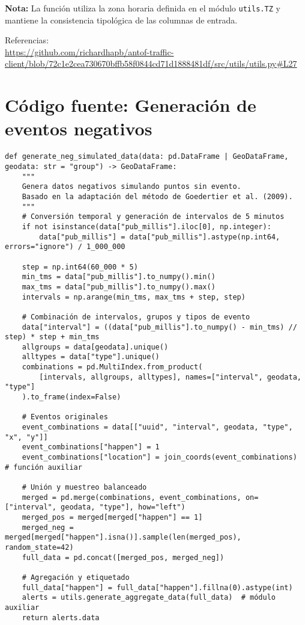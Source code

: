 \documentclass[12pt]{article}
\begin{document}
\noindent\textbf{Nota:}
La función utiliza la zona horaria definida en el módulo \texttt{utils.TZ} y mantiene la consistencia tipológica de las columnas de entrada.

Referencias: \\
\url{https://github.com/richardhapb/antof-traffic-client/blob/72c1e2cea730670bffb58f0844cd71d1888481df/src/utils/utils.py#L27}

\newpage

\section{Código fuente: Generación de eventos negativos}
\label{annex:neg_code}

\begin{verbatim}
def generate_neg_simulated_data(data: pd.DataFrame | GeoDataFrame, geodata: str = "group") -> GeoDataFrame:
    """
    Genera datos negativos simulando puntos sin evento.
    Basado en la adaptación del método de Goedertier et al. (2009).
    """
    # Conversión temporal y generación de intervalos de 5 minutos
    if not isinstance(data["pub_millis"].iloc[0], np.integer):
        data["pub_millis"] = data["pub_millis"].astype(np.int64, errors="ignore") / 1_000_000

    step = np.int64(60_000 * 5)
    min_tms = data["pub_millis"].to_numpy().min()
    max_tms = data["pub_millis"].to_numpy().max()
    intervals = np.arange(min_tms, max_tms + step, step)

    # Combinación de intervalos, grupos y tipos de evento
    data["interval"] = ((data["pub_millis"].to_numpy() - min_tms) // step) * step + min_tms
    allgroups = data[geodata].unique()
    alltypes = data["type"].unique()
    combinations = pd.MultiIndex.from_product(
        [intervals, allgroups, alltypes], names=["interval", geodata, "type"]
    ).to_frame(index=False)

    # Eventos originales
    event_combinations = data[["uuid", "interval", geodata, "type", "x", "y"]]
    event_combinations["happen"] = 1
    event_combinations["location"] = join_coords(event_combinations)  # función auxiliar

    # Unión y muestreo balanceado
    merged = pd.merge(combinations, event_combinations, on=["interval", geodata, "type"], how="left")
    merged_pos = merged[merged["happen"] == 1]
    merged_neg = merged[merged["happen"].isna()].sample(len(merged_pos), random_state=42)
    full_data = pd.concat([merged_pos, merged_neg])

    # Agregación y etiquetado
    full_data["happen"] = full_data["happen"].fillna(0).astype(int)
    alerts = utils.generate_aggregate_data(full_data)  # módulo auxiliar
    return alerts.data
\end{verbatim}
\end{document}
